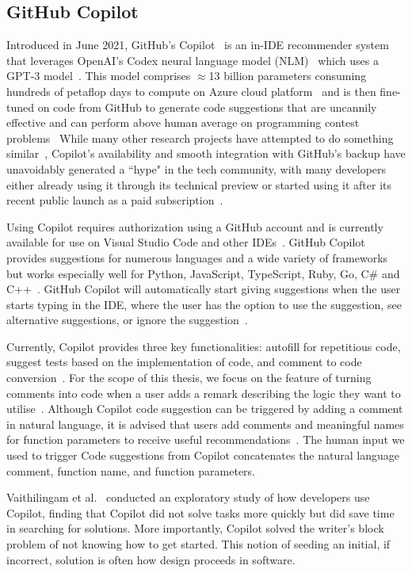 \subsection{GitHub Copilot}
Introduced in June 2021, GitHub's Copilot~\cite{Copilot-web} is an in-IDE recommender system that leverages OpenAI's Codex neural language model (NLM)~\cite{copilot} which uses a GPT-3 model~\cite{Gpt3}. This model comprises $\approx$13 billion parameters consuming hundreds of petaflop days to compute on Azure cloud platform~\cite{copilot} and is then fine-tuned on code from GitHub to generate code suggestions that are uncannily effective and can perform above human average on programming contest problems~\cite{empirical_eval}
While many other research projects have attempted to do something similar~\cite{codesearch, natural, coacor}, Copilot's availability and smooth integration with GitHub's backup have unavoidably generated a ``hype" in the tech community, with many developers either already using it through its technical preview or started using it after its recent public launch as a paid subscription~\cite{Copilot-web}. 

Using Copilot requires authorization using a GitHub account and is currently available for use on Visual Studio Code and other IDEs~\cite{Copilot-web}. GitHub Copilot provides suggestions for numerous languages and a wide variety of frameworks but works especially well for Python, JavaScript, TypeScript, Ruby, Go, C\# and C++~\cite{Copilot-web}. GitHub Copilot will automatically start giving suggestions when the user starts typing in the IDE, where the user has the option to use the suggestion, see alternative suggestions, or ignore the suggestion~\cite{Copilot-web}.

Currently, Copilot provides three key functionalities: autofill for repetitious code, suggest tests based on the implementation of code, and comment to code conversion~\cite{Copilot-web}. For the scope of this thesis, we focus on the feature of turning comments into code when a user adds a remark describing the logic they want to utilise~\cite{Copilot-web}. 
Although Copilot code suggestion can be triggered by adding a comment in natural language, it is advised that users add comments and meaningful names for function parameters to receive useful recommendations~\cite{Copilot-web}. 
The human input we used to trigger Code suggestions from Copilot concatenates the natural language comment, function name, and function parameters.

Vaithilingam et al.~\cite{Vaithilingam2022} conducted an exploratory study of how developers use Copilot, finding that Copilot did not solve tasks more quickly but did save time in searching for solutions. 
More importantly, Copilot solved the writer's block problem of not knowing how to get started. This notion of seeding an initial, if incorrect, solution is often how design proceeds in software. 

